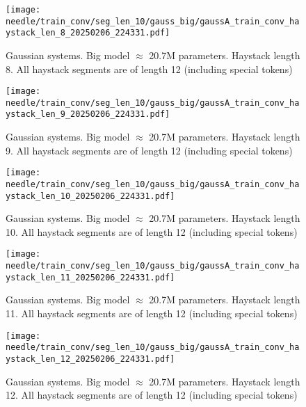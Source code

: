 \begin{figure}[h]
    \centering
    \texttt{[image: needle/train\_conv/seg\_len\_10/gauss\_big/gaussA\_train\_conv\_haystack\_len\_8\_20250206\_224331.pdf]}
    \caption{Gaussian systems. Big model $\approx$ 20.7M parameters. Haystack length 8. All haystack segments are of length 12 (including special tokens)}
    \label{fig:gauss_small_needle_train_conv_haystack_len_8_all_haystack_len_12}

\end{figure}


\begin{figure}[h]
    \centering
    \texttt{[image: needle/train\_conv/seg\_len\_10/gauss\_big/gaussA\_train\_conv\_haystack\_len\_9\_20250206\_224331.pdf]}
    \caption{Gaussian systems. Big model $\approx$ 20.7M parameters. Haystack length 9. All haystack segments are of length 12 (including special tokens)}
    \label{fig:gauss_small_needle_train_conv_haystack_len_9_all_haystack_len_12}

\end{figure}


\begin{figure}[h]
    \centering
    \texttt{[image: needle/train\_conv/seg\_len\_10/gauss\_big/gaussA\_train\_conv\_haystack\_len\_10\_20250206\_224331.pdf]}
    \caption{Gaussian systems. Big model $\approx$ 20.7M parameters. Haystack length 10. All haystack segments are of length 12 (including special tokens)}
    \label{fig:gauss_small_needle_train_conv_haystack_len_10_all_haystack_len_12}

\end{figure}


\begin{figure}[h]
    \centering
    \texttt{[image: needle/train\_conv/seg\_len\_10/gauss\_big/gaussA\_train\_conv\_haystack\_len\_11\_20250206\_224331.pdf]}
    \caption{Gaussian systems. Big model $\approx$ 20.7M parameters. Haystack length 11. All haystack segments are of length 12 (including special tokens)}
    \label{fig:gauss_small_needle_train_conv_haystack_len_11_all_haystack_len_12}

\end{figure}


\begin{figure}[h]
    \centering
    \texttt{[image: needle/train\_conv/seg\_len\_10/gauss\_big/gaussA\_train\_conv\_haystack\_len\_12\_20250206\_224331.pdf]}
    \caption{Gaussian systems. Big model $\approx$ 20.7M parameters. Haystack length 12. All haystack segments are of length 12 (including special tokens)}
    \label{fig:gauss_small_needle_train_conv_haystack_len_12_all_haystack_len_12}

\end{figure}


